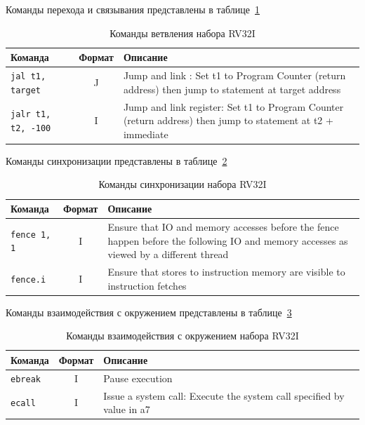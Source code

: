 Команды перехода и связывания представлены в таблице~\ref{table-base-jump}

\begin{table}[h]
    \caption{Команды ветвления набора RV32I}
    \centering
    \begin{tabularx}{\textwidth}{|l|c|X|}
        \hline
        \textbf{Команда} & \textbf{Формат} & \textbf{Описание} \\
        \hline \verb|jal t1, target| & J & Jump and link : Set t1 to Program Counter (return address) then jump to statement at target address \\
        \hline \verb|jalr t1, t2, -100| & I & Jump and link register: Set t1 to Program Counter (return address) then jump to statement at t2 + immediate \\
        \hline
    \end{tabularx}
    \label{table-base-jump}
\end{table}

Команды синхронизации представлены в таблице~\ref{table-base-sync}

\begin{table}[h]
    \caption{Команды синхронизации набора RV32I}
    \centering
    \begin{tabularx}{\textwidth}{|l|c|X|}
        \hline
        \textbf{Команда} & \textbf{Формат} & \textbf{Описание} \\
        \hline \verb|fence 1, 1| & I & Ensure that IO and memory accesses before the fence happen before the following IO and memory accesses as viewed by a different thread \\
        \hline \verb|fence.i| & I & Ensure that stores to instruction memory are visible to instruction fetches \\
        \hline
    \end{tabularx}
    \label{table-base-sync}
\end{table}

Команды взаимодействия с окружением представлены в таблице~\ref{table-base-env}

\begin{table}[h]
    \caption{Команды взаимодействия с окружением набора RV32I}
    \centering
    \begin{tabularx}{\textwidth}{|l|c|X|}
        \hline
        \textbf{Команда} & \textbf{Формат} & \textbf{Описание} \\
        \hline \verb|ebreak| & I & Pause execution \\
        \hline \verb|ecall| & I & Issue a system call: Execute the system call specified by value in a7 \\
        \hline
    \end{tabularx}
    \label{table-base-env}
\end{table}

